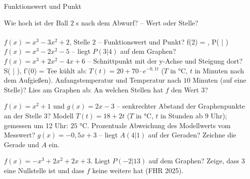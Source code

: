 \setcounter{aufgabe}{8}

\begin{aufgabe}{Funktionswert und Punkt}
\begin{teile}
\teil Wie hoch ist der Ball $2$ s nach dem Abwurf? – Wert oder Stelle? \\  \\ 
\teil $f(x) = x^3 - 3x^2 + 2$, Stelle $2$ – Funktionswert und Punkt? f(2) = \leerfeld , P( \leerfeld | \leerfeld )
\teil $f(x) = x^3 - 2x^2 - 5$ – liegt $P(3 | 4)$ auf dem Graphen?
\teil $f(x) = x^3 + 2x^2 - 4x + 6$ – Schnittpunkt mit der y-Achse und Steigung dort? S( \leerfeld | \leerfeld ), f'(0) = \leerfeld
\teil Tee kühlt ab: $T(t) = 20 + 70 \cdot e^{-0{,}1t}$ ($T$ in °C, $t$ in Minuten nach dem Aufgießen). Anfangstemperatur und Temperatur nach $10$ Minuten (auf eine Stelle)?
\teil Lies am Graphen ab: An welchen Stellen hat $f$ den Wert $3$?

\begin{ksys}[xmin=-4,xmax=4,ymin=-2,ymax=6,ablesen]\end{ksys}
\teil $f(x) = x^2 + 1$ und $g(x) = 2x - 3$ – senkrechter Abstand der Graphenpunkte an der Stelle $3$?
\teil Modell $T(t) = 18 + 2t$ ($T$ in °C, $t$ in Stunden ab 9 Uhr); gemessen um 12 Uhr: $25$ °C. Prozentuale Abweichung des Modellwerts vom Messwert?
\teil $g(x) = -0{,}5x + 3$ – liegt $A(4 | 1)$ auf der Geraden? Zeichne die Gerade und $A$ ein.

\begin{ksys}[xmin=-2,xmax=6,ymin=-2,ymax=5]\end{ksys}
\teil $f(x) = -x^3 + 2x^2 + 2x + 3$. Liegt $P(-2 | 13)$ auf dem Graphen? Zeige, dass $3$ eine Nullstelle ist und dass $f$ keine weitere hat \hfill (FHR 2025).
\end{teile}
\end{aufgabe}

